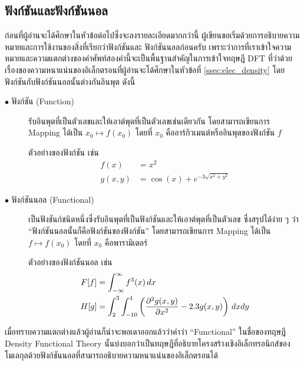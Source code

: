 \subsection{ฟังก์ชันและฟังก์ชันนอล}
\label{ssec:function_functional}

ก่อนที่ผู้อ่านจะได้ศึกษาในหัวข้อต่อไปซึ่งจะลงรายละเอียดมากกว่านี้ ผู้เขียนขอเริ่มด้วยการอธิบายความหมายและการใช้งานของสิ่งที่เรียกว่าฟังก์ชันและ%
ฟังก์ชันนอลก่อนครับ เพราะว่าการที่เราเข้าใจความหมายและความแตกต่างของคำศัพท์สองคำนี้จะเป็นพื้นฐานสำคัญในการเข้าใจทฤษฎี DFT ที่ว่าด้วย%
เรื่องของความหนาแน่นของอิเล็กตรอนที่ผู้อ่านจะได้ศึกษาในหัวข้อที่ \ref{ssec:elec_density} โดยฟังก์ชันกับฟังก์ชันนอลนั้นต่างกันอินพุต ดังนี้

\begin{description}
    \item[$\bullet$ ฟังก์ชัน (Function)] รับอินพุตที่เป็นตัวเลขและให้เอาต์พุตที่เป็นตัวเลขเช่นเดียวกัน โดยสามารถเขียนการ Mapping
        ได้เป็น $x_0 \mapsto f(x_0)$ โดยที่ $x_{0}$ คืออาร์กิวเมนต์หรืออินพุตของฟังก์ชัน $f$

        ตัวอย่างของฟังก์ชัน เช่น
        \begin{align*}
            f(x)   & = x^{2}                                \\
            g(x,y) & = \cos(x) + e^{-3\sqrt{x^{2} + y^{2}}}
        \end{align*}

    \item[$\bullet$ ฟังก์ชันนอล (Functional)] เป็นฟังชันก์ชนิดหนึ่งซึ่งรับอินพุตที่เป็นฟังก์ชันและให้เอาต์พุตที่เป็นตัวเลข ซึ่งสรุปได้ง่าย ๆ
        ว่า \enquote{ฟังก์ชันนอลนั้นก็คือฟังก์ชันของฟังก์ชัน} โดยสามารถเขียนการ Mapping ได้เป็น $f \mapsto f(x_0)$ โดยที่ $x_{0}$
        คือพารามิเตอร์

        ตัวอย่างของฟังก์ชันนอล เช่น
        \begin{align*}
            F[f] & = \int^{\infty}_{-\infty} f^{3}(x) \, dx                                                \\
            H[g] & = \int^{3}_{2} \int^{4}_{-10} \left ( \pdv[2]{g(x,y)}{x} - 2.3 g(x,y) \right ) \, dx dy
        \end{align*}
\end{description}

เมื่อทราบความแตกต่างแล้วผู้อ่านก็น่าจะพอเดาออกแล้วว่าคำว่า \enquote{Functional} ในชื่อของทฤษฎี Density Functional Theory
นั้นบ่งบอกว่าเป็นทฤษฎีที่อธิบายโครงสร้างเชิงอิเล็กทรอนิกส์ของโมเลกุลด้วยฟังก์ชันนอลที่สามารถอธิบายความหนาแน่นของอิเล็กตรอนได้

